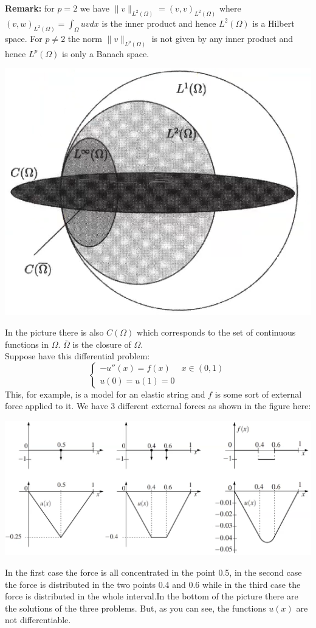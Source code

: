 \textbf{Remark:} for $p=2$ we have $\|v\|_{L^2(\Omega)} = (v,v)_{L^2(\Omega)}$ where $(v,w)_{L^2(\Omega)} = \int_{\Omega} uv dx$ is the inner product and hence $L^2(\Omega)$ is a Hilbert space. For $p\neq2$ the norm $\|v\|_{L^p(\Omega)}$ is not given by any inner product and hence $L^p(\Omega)$ is only a Banach space.\\
\begin{center}
    \includegraphics[scale = 0.35]{../images/LpSpaces.png}
\end{center}
In the picture there is also $C(\Omega)$ which corresponds to the set of continuous functions in $\Omega$. $\bar{\Omega}$ is the closure of $\Omega$.\\

Suppose have this differential problem:
\[
    \begin{cases}
        -u''(x) = f(x) & x \in (0,1)\\  
        u(0) = u(1) = 0
    \end{cases}    
\]
This, for example, is a model for an elastic string and $f$ is some sort of external force applied to it. We have 3 different external forces as shown in the figure here:
\begin{center}
    \includegraphics[scale = 0.35]{../images/ExternalForces.png}    
\end{center}
In the first case the force is all concentrated in the point 0.5, in the second case the force is distributed in the two points 0.4 and 0.6 while in the third case the force is distributed in the whole interval.In the bottom of the picture there are the solutions of the three problems. But, as you can see, the functions $u(x)$ are not differentiable.

